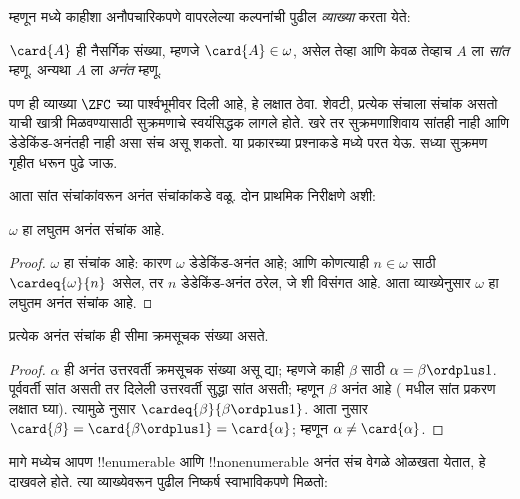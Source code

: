 \documentclass[../../../include/open-logic-section]{subfiles}
\begin{document}
म्हणून  मध्ये काहीशा अनौपचारिकपणे वापरलेल्या कल्पनांची पुढील \emph{व्याख्या} करता येते:

\begin{defn}
$\card{A}$ ही नैसर्गिक संख्या, म्हणजे $\card{A} \in \omega$, असेल तेव्हा आणि केवळ तेव्हाच $A$ ला \emph{सांत} म्हणू. अन्यथा $A$ ला \emph{अनंत} म्हणू.
\end{defn}
\noindent
पण ही व्याख्या $\ZFC$ च्या पार्श्वभूमीवर दिली आहे, हे लक्षात ठेवा. शेवटी, प्रत्येक संचाला संचांक असतो याची खात्री मिळवण्यासाठी सुक्रमणाचे स्वयंसिद्धक लागले होते. खरे तर सुक्रमणाशिवाय सांतही नाही आणि डेडेकिंड-अनंतही नाही असा संच असू शकतो. या प्रकारच्या प्रश्नाकडे  मध्ये परत येऊ. सध्या सुक्रमण गृहीत धरून पुढे जाऊ.

आता सांत संचांकांवरून अनंत संचांकांकडे वळू. दोन प्राथमिक निरीक्षणे अशी:

\begin{cor}
$\omega$ हा लघुतम अनंत संचांक आहे.
\end{cor}

\begin{proof}
$\omega$ हा संचांक आहे: कारण $\omega$ डेडेकिंड-अनंत आहे; आणि कोणत्याही $n \in \omega$ साठी $\cardeq{\omega}{n}$ असेल, तर $n$ डेडेकिंड-अनंत ठरेल, जे  शी विसंगत आहे. आता व्याख्येनुसार $\omega$ हा लघुतम अनंत संचांक आहे.
\end{proof}

\begin{cor}
प्रत्येक अनंत संचांक ही सीमा क्रमसूचक संख्या असते.
\end{cor}

\begin{proof}
$\alpha$ ही अनंत उत्तरवर्ती क्रमसूचक संख्या असू द्या; म्हणजे काही $\beta$ साठी $\alpha = \beta
\ordplus 1$. पूर्ववर्ती सांत असती तर दिलेली उत्तरवर्ती सुद्धा सांत असती; म्हणून $\beta$ अनंत आहे ( मधील सांत प्रकरण लक्षात घ्या). त्यामुळे  नुसार $\cardeq{\beta}{\beta \ordplus 1}$. आता
 नुसार
$\card{\beta} = \card{\beta\ordplus 1} = \card{\alpha}$; म्हणून
$\alpha \neq \card{\alpha}$.
\end{proof}

मागे  मध्येच आपण !!{enumerable} आणि !!{nonenumerable} अनंत संच वेगळे ओळखता येतात, हे दाखवले होते. त्या व्याख्येवरून पुढील निष्कर्ष स्वाभाविकपणे मिळतो:
\end{document}
